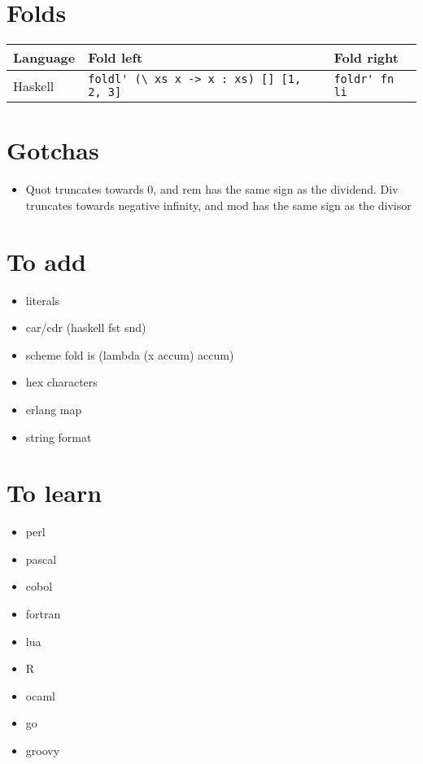 \documentclass{article}
\begin{document}
\section{Folds}
\begin{longtabu} to 0.75\linewidth { X X X }
	Language & Fold left & Fold right \\
	\hline
	Haskell & \lstinline$foldl' (\ xs x -> x : xs) [] [1, 2, 3]$ & \lstinline$foldr' fn li$ \\
\end{longtabu}

\section{Gotchas}
\begin{itemize}
	\item Quot truncates towards 0, and rem has the same sign as the dividend. Div truncates towards negative infinity, and mod has the same sign as the divisor
\end{itemize}

\section{To add}
\begin{itemize}
	\item literals
	\item car/cdr (haskell fst snd)
	\item scheme fold is (lambda (x accum) accum)
	\item hex characters
	\item erlang map
	\item string format
\end{itemize}

\section{To learn}
\begin{itemize}
	\item perl
	\item pascal
	\item cobol
	\item fortran
	\item lua
	\item R
	\item ocaml
	\item go
	\item groovy
\end{itemize}
\end{document}
